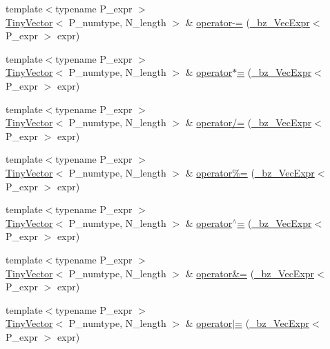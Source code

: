 \begin{DoxyCompactItemize}
\item 
{\footnotesize template$<$typename P\+\_\+expr $>$ }\\\hyperlink{classTinyVector}{Tiny\+Vector}$<$ P\+\_\+numtype, N\+\_\+length $>$ \& \hyperlink{classTinyVector_a44ab5d65ac32b0853931076d3c1c56fc}{operator-\/=} (\hyperlink{class__bz__VecExpr}{\+\_\+bz\+\_\+\+Vec\+Expr}$<$ P\+\_\+expr $>$ expr)
\item 
{\footnotesize template$<$typename P\+\_\+expr $>$ }\\\hyperlink{classTinyVector}{Tiny\+Vector}$<$ P\+\_\+numtype, N\+\_\+length $>$ \& \hyperlink{classTinyVector_acf546bb7e0e91343d1396e278c5e0315}{operator$\ast$=} (\hyperlink{class__bz__VecExpr}{\+\_\+bz\+\_\+\+Vec\+Expr}$<$ P\+\_\+expr $>$ expr)
\item 
{\footnotesize template$<$typename P\+\_\+expr $>$ }\\\hyperlink{classTinyVector}{Tiny\+Vector}$<$ P\+\_\+numtype, N\+\_\+length $>$ \& \hyperlink{classTinyVector_ad2a439d4e4c26617aa98cc3cce8072f9}{operator/=} (\hyperlink{class__bz__VecExpr}{\+\_\+bz\+\_\+\+Vec\+Expr}$<$ P\+\_\+expr $>$ expr)
\item 
{\footnotesize template$<$typename P\+\_\+expr $>$ }\\\hyperlink{classTinyVector}{Tiny\+Vector}$<$ P\+\_\+numtype, N\+\_\+length $>$ \& \hyperlink{classTinyVector_a1767fd3f35cf3afdc8161f3f1153e07f}{operator\%=} (\hyperlink{class__bz__VecExpr}{\+\_\+bz\+\_\+\+Vec\+Expr}$<$ P\+\_\+expr $>$ expr)
\item 
{\footnotesize template$<$typename P\+\_\+expr $>$ }\\\hyperlink{classTinyVector}{Tiny\+Vector}$<$ P\+\_\+numtype, N\+\_\+length $>$ \& \hyperlink{classTinyVector_a8f881dd97285579fb46097958d6f6f32}{operator$^\wedge$=} (\hyperlink{class__bz__VecExpr}{\+\_\+bz\+\_\+\+Vec\+Expr}$<$ P\+\_\+expr $>$ expr)
\item 
{\footnotesize template$<$typename P\+\_\+expr $>$ }\\\hyperlink{classTinyVector}{Tiny\+Vector}$<$ P\+\_\+numtype, N\+\_\+length $>$ \& \hyperlink{classTinyVector_ab1b58f098e5a9d908d72494152a34aff}{operator\&=} (\hyperlink{class__bz__VecExpr}{\+\_\+bz\+\_\+\+Vec\+Expr}$<$ P\+\_\+expr $>$ expr)
\item 
{\footnotesize template$<$typename P\+\_\+expr $>$ }\\\hyperlink{classTinyVector}{Tiny\+Vector}$<$ P\+\_\+numtype, N\+\_\+length $>$ \& \hyperlink{classTinyVector_a4e72b8fea8c5c6b39d5f669ff7b84cca}{operator$\vert$=} (\hyperlink{class__bz__VecExpr}{\+\_\+bz\+\_\+\+Vec\+Expr}$<$ P\+\_\+expr $>$ expr)

\end{DoxyCompactItemize}
